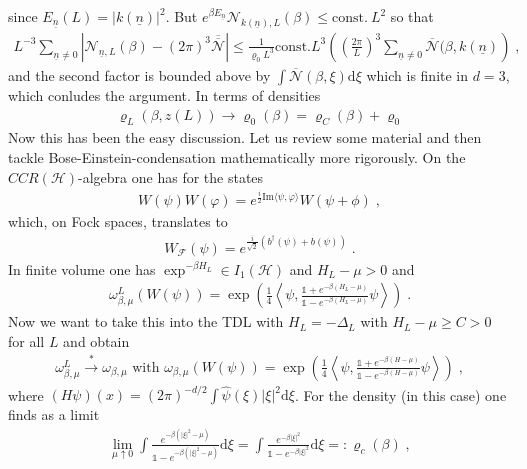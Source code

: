 \documentclass[
a4paper, %
11pt, %
onecolumn, %
openany, %
]{memoir}
\theoremstyle{definition}
\theoremstyle{remark}
\theoremstyle{plain}
\begin{document}
since $E_{\underline{n}}(L)=|k(\underline{n})|^2$. But $e^{\beta E_{\underline{n}}}\mathcal{N}_{k(\underline{n}),L}(\beta)\leq \mathrm{const.~}L^2$ so that \begin{align}
L^{-3}\sum_{\underline{n}\neq 0} \left|\mathcal{N}_{\underline{n},L}(\beta)-(2\pi)^3\overline{\overline{\mathcal{N}}}\right| \leq \frac{1}{\varrho_0 L^3}\mathrm{const.}L^3 \left(\left(\frac{2\pi}{L}\right)^3\sum_{\underline{n}\neq 0}\overline{\mathcal{N}}(\beta,k(\underline{n})\right)\;,
\end{align}
and the second factor is bounded above by $\int\overline{\mathcal{N}}(\beta,\xi)\mathrm{d}\xi$ which is finite in $d=3$, which conludes the argument. In terms of densities \begin{align}
\varrho_L(\beta,z(L))\rightarrow \varrho_0(\beta)=\varrho_C(\beta)+\varrho_0
\end{align}
Now this has been the easy discussion. Let us review some material and then tackle Bose-Einstein-condensation mathematically more rigorously. On the $CCR(\mathcal{H})$-algebra one has for the states \begin{align}
W(\psi)W(\varphi)=e^{\frac{i}{2}\mathrm{Im}\langle\psi,\varphi\rangle}W(\psi+\phi)\; ,\end{align}
which, on Fock spaces, translates to \begin{align}
W_{\mathcal{F}}(\psi)=e^{\frac{i}{\sqrt{2}}(b^{\dagger}(\psi)+b(\psi))}\;.
\end{align}
In finite volume one has $\exp^{-\beta H_L}\in I_1(\mathcal{H})$ and $H_{L}-\mu >0$ and \begin{align}
\omega_{\beta,\mu}^L(W(\psi))=\exp\left(\frac{1}{4}\left\langle \psi,\frac{\mathds{1}+e^{-\beta(H_L-\mu)}}{\mathds{1}-e^{-\beta(H_L-\mu)}}\psi\right\rangle\right)\; .
\end{align}
Now we want to take this into the TDL with $H_L=-\Delta_L$ with $H_L-\mu\geq C>0$ for all $L$ and obtain\begin{align}
\omega_{\beta,\mu}^L\overset{*}{\longrightarrow}\omega_{\beta,\mu} \text{ with } \omega_{\beta,\mu}(W(\psi))=\exp\left(\frac{1}{4}\left\langle \psi,\frac{\mathds{1}+e^{-\beta(H-\mu)}}{\mathds{1}-e^{-\beta(H-\mu)}}\psi\right\rangle\right)\; ,
\end{align}
where $(H\psi)(x)=(2\pi)^{-d/2}\int\hat{\psi}(\xi)|\xi|^2\mathrm{d}\xi$. For the density (in this case) one finds as a limit \begin{align}
\lim_{\mu\uparrow 0}\int\frac{e^{-\beta(|\xi|^2-\mu)}}{\mathds{1}-e^{-\beta(|\xi|^2-\mu)}}\mathrm{d}\xi = \int\frac{e^{-\beta|\xi|^2}}{\mathds{1}-e^{-\beta|\xi|^2}}\mathrm{d}\xi =: \varrho_{c}(\beta)\; ,
\end{align}
\end{document}
